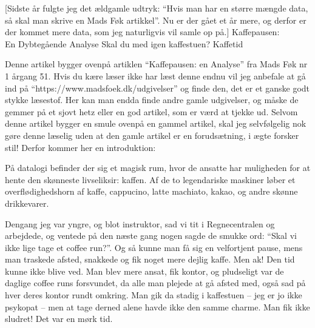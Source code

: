 \begin{article}
[Sidste år fulgte jeg det ældgamle udtryk: ``Hvis man har en større mængde data, så skal man skrive en Mads Føk artikkel''. Nu er der gået et år mere, og derfor er der kommet mere data, som jeg naturligvis vil samle op på.]
{Kaffepausen: \\ En Dybtegående Analyse}
{Skal du med igen kaffestuen?}
{Kaffetid \protect\coffee\ }

\renewcommand{\figurename}{Figur.}

Denne artikel bygger ovenpå artiklen ``Kaffepausen: en Analyse'' fra Mads Føk nr 1 årgang 51. Hvis du kære læser ikke har læst denne endnu vil jeg anbefale at gå ind på ``https://www.madsfoek.dk/udgivelser'' og finde den, det er et ganske godt stykke læsestof. Her kan man endda finde andre gamle udgivelser, og måske de gemmer på et sjovt hetz eller en god artikel, som er værd at tjekke ud.
Selvom denne artikel bygger en smule ovenpå en gammel artikel, skal jeg selvfølgelig nok gøre denne læselig uden at den gamle artikel er en forudsætning, i ægte forsker stil!
Derfor kommer her en introduktion:

På datalogi befinder der sig et magisk rum, hvor de ansatte har muligheden for at hente den skønneste livseliksir: kaffen. Af de to legendariske maskiner løber et overflødighedshorn af kaffe, cappucino, latte machiato, kakao, og andre skønne drikkevarer.

Dengang jeg var yngre, og blot instruktor, sad vi tit i Regnecentralen og arbejdede, og ventede på den næste gang nogen sagde de smukke ord: ``Skal vi ikke lige tage et coffee run?''. Og så kunne man få sig en velfortjent pause, mens man traskede afsted, snakkede og fik noget mere dejlig kaffe. Men ak! Den tid kunne ikke blive ved. Man blev mere ansat, fik kontor, og pludseligt var de daglige coffee runs forsvundet, da alle man plejede at gå afsted med, også sad på hver deres kontor rundt omkring. Man gik da stadig i kaffestuen -- jeg er jo ikke psykopat -- men at tage derned alene havde ikke den samme charme. Man fik ikke sludret! Det var en mørk tid.


\end{article}

